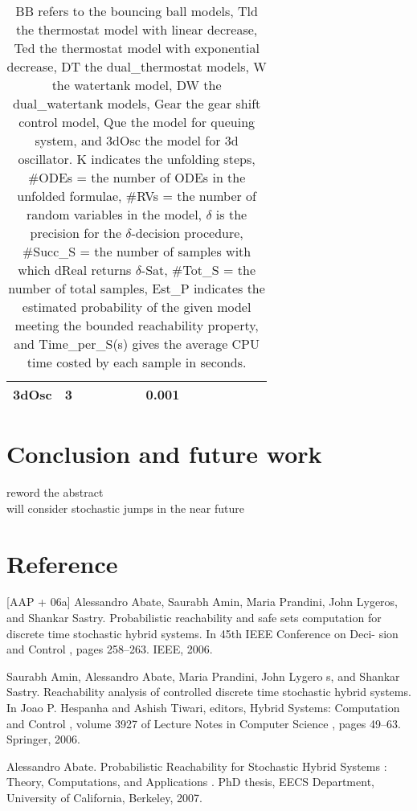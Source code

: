 \documentclass[runningheads,a4paper]{llncs}
\begin{document}
\begin{table}[h]
\begin{tabular}{|l|l|l|l|l|l|l|l|l|l|}
    3dOsc     & 3       & ~ & ~      & ~     & 0.001           & ~      & ~      & ~      & ~            \\ \hline
    \end{tabular}
    \caption {BB refers to the bouncing ball models, Tld the thermostat model with linear decrease, Ted the thermostat model with exponential decrease, DT the dual\_thermostat models, W the watertank model, DW the dual\_watertank models, Gear the gear shift control model, Que the model for queuing system, and 3dOsc the model for 3d oscillator. K indicates the unfolding steps, \#ODEs = the number of ODEs in the unfolded formulae, \#RVs = the number of random variables in the model, $\delta$ is the precision for the $\delta$-decision procedure, \#Succ\_S = the number of samples with which dReal returns $\delta$-Sat, \#Tot\_S = the number of total samples, Est\_P indicates the estimated probability of the given model meeting the bounded reachability property, and Time\_per\_S(s) gives the average CPU time costed by each sample in seconds.}
    \label{table:exp}
\end{table}



\section{Conclusion and future work}
reword the abstract\\
will consider stochastic jumps in the near future

\section*{Reference}

[AAP + 06a] Alessandro Abate, Saurabh Amin, Maria Prandini, John Lygeros, and Shankar Sastry. Probabilistic reachability and safe sets computation for discrete time stochastic hybrid systems. In 45th IEEE Conference on Deci- sion and Control , pages 258–263. IEEE, 2006.

\noindent[AAP + 06b] Saurabh Amin, Alessandro Abate, Maria Prandini, John Lygero s, and Shankar Sastry. Reachability analysis of controlled discrete time stochastic hybrid systems. In Joao P. Hespanha and Ashish Tiwari, editors, Hybrid Systems: Computation and Control , volume 3927 of Lecture Notes in Computer Science , pages 49–63. Springer, 2006.

\noindent[Aba07] Alessandro Abate. Probabilistic Reachability for Stochastic Hybrid Systems : Theory, Computations, and Applications . PhD thesis, EECS Department, University of California, Berkeley, 2007.
\end{document}
